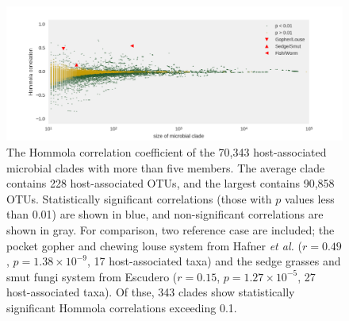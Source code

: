 \begin{figure}
    \includegraphics[width=\textwidth]{figures/Hommola_correlations.png}
    \caption{The Hommola correlation coefficient of the 70,343 host-associated microbial clades with more than five members. The average clade contains 228 host-associated OTUs, and the largest contains 90,858 OTUs. Statistically significant correlations (those with $p$ values less than 0.01) are shown in blue, and non-significant correlations are shown in gray. For comparison, two reference case are included; the pocket gopher and chewing louse system from Hafner {\em et al.} ($r=0.49$, $p=1.38\times 10^{-9}$, 17 host-associated taxa) and the sedge grasses and smut fungi system from Escudero ($r=0.15$, $p=1.27\times 10^{-5}$, 27 host-associated taxa). \cite{hafner1994disparate,escudero2015phylogenetic} Of thse, 343 clades show statistically significant Hommola correlations exceeding 0.1.}
    \label{FP_hommola_corr}
\end{figure}
